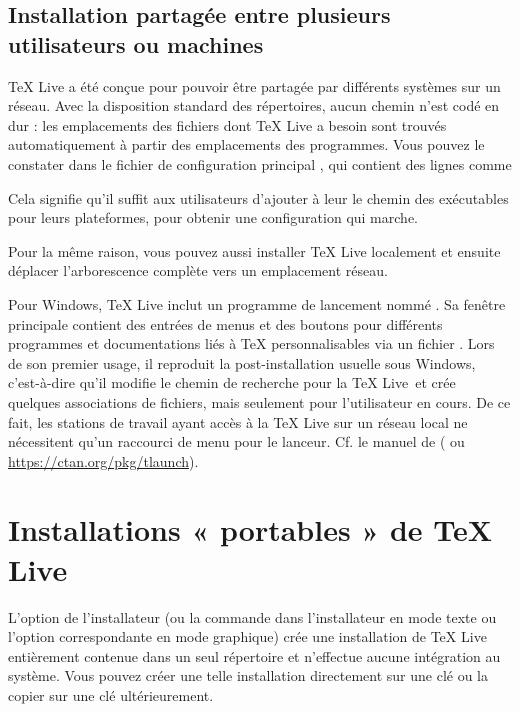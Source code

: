 \documentclass[german, english, french]{article}
\renewcommand{\TL}{\TeX{} Live\xspace}%
\begin{document}
\subsection{Installation partagée entre plusieurs utilisateurs ou machines}
\label{sec:sharedinstall}

\TL a été conçue pour pouvoir être partagée par différents systèmes sur un
réseau.  Avec la disposition standard des répertoires, aucun chemin n'est codé
en dur : les emplacements des fichiers dont \TL a besoin sont trouvés
automatiquement à partir des emplacements des programmes. Vous pouvez le
constater dans le fichier de configuration principal
, %
qui contient des lignes comme
Cela signifie qu'il suffit aux utilisateurs d'ajouter à leur  le
chemin des exécutables pour leurs plateformes, pour obtenir une configuration
qui marche.

Pour la même raison, vous pouvez aussi installer \TL localement et ensuite
déplacer l'arborescence complète vers un emplacement réseau.

Pour Windows, \TL{} inclut un programme de lancement nommé
. Sa fenêtre principale contient des entrées de menus et des
boutons pour différents programmes et documentations liés à \TeX{}
personnalisables via un fichier . Lors de son premier usage, il
reproduit la post-installation usuelle sous Windows, c'est-à-dire qu'il modifie
le chemin de recherche pour la \TL\ et crée quelques associations de fichiers,
mais seulement pour l'utilisateur en cours. De ce fait, les stations de travail
ayant accès à la \TL{} sur un réseau local ne nécessitent qu'un raccourci de
menu pour le lanceur. Cf. le manuel de  ( ou
\url{https://ctan.org/pkg/tlaunch}).

\section{Installations « portables » de \protect\TL}
\label{sec:portable-tl}

L'option  de l'installateur (ou la commande  dans
l'installateur en mode texte ou l'option correspondante en mode graphique) crée
une installation de \TL{} entièrement contenue dans un seul répertoire et
n'effectue aucune intégration au système. Vous pouvez créer une telle
installation directement sur une clé \USB{} ou la copier sur une clé
ultérieurement.
\end{document}

